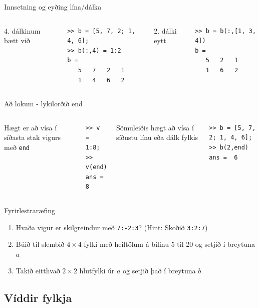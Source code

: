 \documentclass[handout]{beamer}
\begin{document}
\begin{frame}[fragile]{Innsetning og eyðing lína/dálka}
\begin{columns}
4. dálkinum bætt við
\begin{verbatim}
>> b = [5, 7, 2; 1, 4, 6];
>> b(:,4) = 1:2
b =
   5   7   2   1
   1   4   6   2
\end{verbatim}
2. dálki eytt
\begin{verbatim}
>> b = b(:,[1, 3, 4])
b =
   5   2   1
   1   6   2
\end{verbatim}
\vspace{\baselineskip}
\end{columns}
\end{frame}

\begin{frame}[fragile]{Að lokum - lykilorðið end}
\begin{columns}
Hægt er að vísa í síðasta stak vigurs með \texttt{end}
\begin{verbatim}
>> v = 1:8;
>> v(end)
ans =  8
\end{verbatim}
Sömuleiðis hægt að vísa í síðustu línu eða dálk fylkis
\begin{verbatim}
>> b = [5, 7, 2; 1, 4, 6];
>> b(2,end)
ans =  6
\end{verbatim}
\end{columns}
\end{frame}

\begin{frame}{Fyrirlestraræfing}
\begin{enumerate}
 \item Hvaða vigur er skilgreindur með \texttt{7:-2:3}? (Hint: Skoðið \texttt{3:2:7})
 \item Búið til slembið $4 \times 4$ fylki með heiltölum á bilinu 5 til 20 og setjið í breytuna $a$
 \item Takið eitthvað $2 \times 2$ hlutfylki úr $a$ og setjið það í breytuna $b$
\end{enumerate}
\end{frame}

\subsection{Víddir fylkja}
\end{document}
